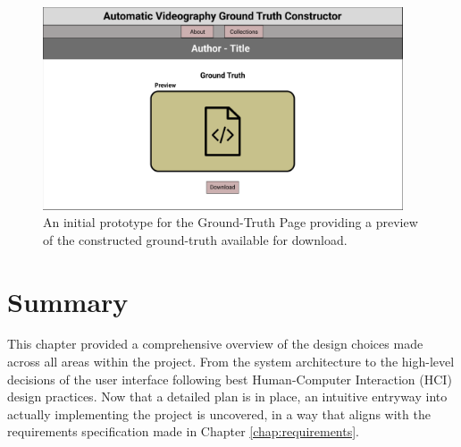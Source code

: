 \documentclass{l4proj}
\begin{document}
\begin{figure}[H]
    \centering
    \includegraphics[width=0.95\textwidth]{figures/ground_truth_page.pdf}
    \caption{An initial prototype for the Ground-Truth Page providing a preview of the constructed ground-truth available for download.}
    \label{fig:ground_truth_page}
\end{figure}


\section{Summary}
This chapter provided a comprehensive overview of the design choices made across all areas within the project. From the system architecture to the high-level decisions of the user interface following best Human-Computer Interaction (HCI) design practices. Now that a detailed plan is in place, an intuitive entryway into actually implementing the project is uncovered, in a way that aligns with the requirements specification made in Chapter \ref{chap:requirements}. 



\end{document}
